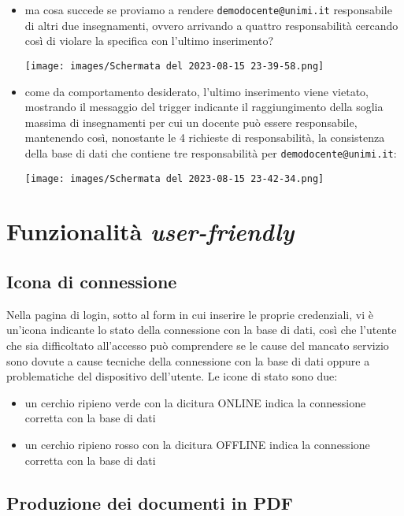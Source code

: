 \documentclass{article}
\newcommand{\und}[0]{\textunderscore}
\begin{document}
\begin{itemize}
\begin{itemize}
        \item ma cosa succede se proviamo a rendere \texttt{demo\und docente@unimi.it} responsabile di altri due insegnamenti, ovvero arrivando a quattro responsabilità cercando così di violare la specifica con l'ultimo inserimento?

        \texttt{[image: images/Schermata del 2023-08-15 23-39-58.png]}

        \item come da comportamento desiderato, l'ultimo inserimento viene vietato, mostrando il messaggio del trigger indicante il raggiungimento della soglia massima di insegnamenti per cui un docente può essere responsabile, mantenendo così, nonostante le 4 richieste di responsabilità, la consistenza della base di dati che contiene tre responsabilità per \texttt{demo\und docente@unimi.it}:

        \texttt{[image: images/Schermata del 2023-08-15 23-42-34.png]}
    \end{itemize}


\end{itemize}
\section{Funzionalità \textit{user-friendly}}
\subsection{Icona di connessione}
Nella pagina di login, sotto al form in cui inserire le proprie credenziali, vi è un'icona indicante lo stato della connessione con la base di dati, così che l'utente che sia difficoltato all'accesso può comprendere se le cause del mancato servizio sono dovute a cause tecniche della connessione con la base di dati oppure a problematiche del dispositivo dell'utente. Le icone di stato sono due:
\begin{itemize}
    \item un cerchio ripieno verde con la dicitura ONLINE indica la connessione corretta con la base di dati
    \item un cerchio ripieno rosso con la dicitura OFFLINE indica la connessione corretta con la base di dati
\end{itemize}

\subsection{Produzione dei documenti in PDF}
\end{document}
